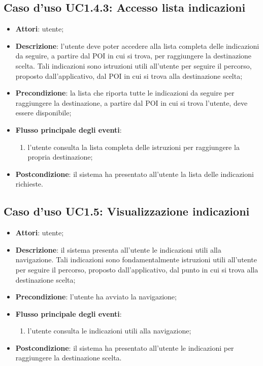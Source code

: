 \documentclass[../AnalisiDeiRequisiti.tex]{subfiles}
\begin{document}
\subsection{Caso d'uso UC1.4.3: Accesso lista indicazioni}
\begin{itemize}
\item \textbf{Attori}: utente;
\item \textbf{Descrizione}: l'utente deve poter accedere alla lista completa delle indicazioni da seguire, a partire dal POI in cui si trova, per raggiungere la destinazione scelta. Tali indicazioni sono istruzioni utili all'utente per seguire il percorso, proposto dall'applicativo, dal POI in cui si trova alla destinazione scelta; 
      \item \textbf{Precondizione}: la lista che riporta tutte le indicazioni da seguire per raggiungere la destinazione, a partire dal POI in cui si trova l'utente, deve essere disponibile;

        \item \textbf{Flusso principale degli eventi}:
          \begin{enumerate}
          \item l'utente consulta la lista completa delle istruzioni per raggiungere la propria destinazione;

      \end{enumerate}
    \item \textbf{Postcondizione}: il sistema ha presentato all'utente la lista delle indicazioni richieste.
  \end{itemize}
\hypertarget{UC1.5}{}
\subsection{Caso d'uso UC1.5: Visualizzazione indicazioni}

\begin{itemize}
\item \textbf{Attori}: utente;
\item \textbf{Descrizione}: il sistema presenta all'utente le indicazioni utili alla navigazione. Tali indicazioni sono fondamentalmente istruzioni utili all'utente per seguire il percorso, proposto dall'applicativo, dal punto in cui si trova alla destinazione scelta; 
      \item \textbf{Precondizione}: l'utente ha avviato la navigazione;

        \item \textbf{Flusso principale degli eventi}:
          \begin{enumerate}
          \item l'utente consulta le indicazioni utili alla navigazione;

      \end{enumerate}

    \item \textbf{Postcondizione}: il sistema ha presentato all'utente le indicazioni per raggiungere la destinazione scelta.
  \end{itemize}
\hypertarget{UC1.6}{}
\end{document}
